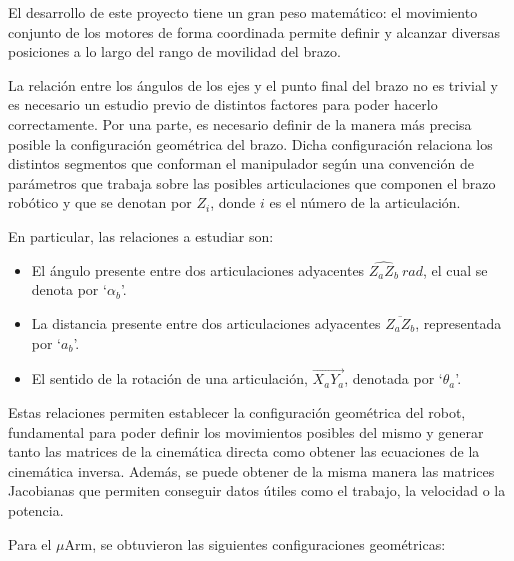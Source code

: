 El desarrollo de este proyecto tiene un gran peso matemático: el movimiento conjunto
de los motores de forma coordinada permite definir y alcanzar
diversas posiciones a lo largo del rango de movilidad del brazo.

La relación entre los ángulos de los ejes y el punto final del brazo no es trivial y 
es necesario un estudio previo de distintos factores para poder hacerlo correctamente. 
Por una parte, es necesario definir de la manera más precisa posible la configuración 
geométrica del brazo. Dicha configuración relaciona los distintos segmentos que
conforman el manipulador según una convención de parámetros
que trabaja sobre las posibles articulaciones que componen el brazo robótico 
y que se denotan por $Z_i$, donde $i$ es el número de la articulación.

En particular, las relaciones a estudiar son:

\begin{itemize}
    \item El ángulo presente entre dos articulaciones adyacentes
          $\widehat{Z_aZ_b}~rad$, el cual se denota por `$\alpha_b$'.
    \item La distancia presente entre dos articulaciones adyacentes
          $\overline{Z_aZ_b}$, representada por `$a_b$'.
    \item El sentido de la rotación de una articulación,
          $\overrightarrow{X_aY_a}$, denotada por `$\theta_a$'.
\end{itemize}

Estas relaciones permiten establecer la configuración geométrica del robot,
fundamental para poder definir los movimientos posibles del mismo y generar tanto
las matrices de la cinemática directa como obtener las ecuaciones de la cinemática
inversa. Además, se puede obtener de la misma manera las matrices Jacobianas que
permiten conseguir datos útiles como el trabajo, la velocidad o la potencia.

Para el $\mu$Arm, se obtuvieron las siguientes configuraciones geométricas:

